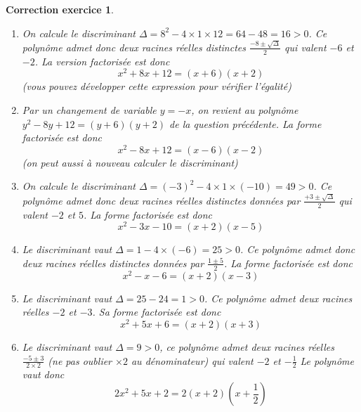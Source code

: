\documentclass[12pt]{article}
\newtheorem{correction}{\bf Correction exercice}
\newenvironment{cor}{
\begin{correction}\smallskip\normalfont}{\end{correction}
}
\newif\ifcorrige\corrigefalse
\begin{document}
\ifcorrige
\color{magenta}
\begin{cor}
  $\qquad$
\begin{enumerate}
\item On calcule le discriminant
  $\Delta = 8^2 - 4\times 1 \times 12 = 64 - 48 = 16 > 0$.
  Ce polyn\^ome admet donc deux racines r\'eelles distinctes
  $\frac{-8 \pm \sqrt{\Delta}}{2}$ qui valent $-6$ et $-2$.
  La version factoris\'ee est donc
  \begin{equation*}
    x^2 + 8x + 12
    =
    (x+6)(x+2)
  \end{equation*}
  (vous pouvez d\'evelopper cette expression pour v\'erifier l'\'egalit\'e)
\item Par un changement de variable $y=-x$, on revient au polyn\^ome
  $y^2-8y+12 = (y+6)(y+2)$ de la question pr\'ec\'edente.
  La forme factoris\'ee est donc
  \begin{equation*}
    x^2 - 8x + 12
    =
    (x-6)(x-2)
  \end{equation*}
  (on peut aussi \`a nouveau calculer le discriminant)
\item On calcule le discriminant
  $\Delta = (-3)^2 -4 \times 1 \times (-10) = 49 > 0$.
  Ce polyn\^ome admet donc deux racines r\'eelles distinctes donn\'ees par
  $\frac{+3\pm \sqrt{\Delta}}{2}$ qui valent $-2$ et $5$.
  La forme factoris\'ee est donc
  \begin{equation*}
    x^2-3x-10 = (x+2)(x-5)
  \end{equation*}
\item Le discriminant vaut $\Delta = 1 - 4 \times (-6) = 25 > 0$.
  Ce polyn\^ome admet donc deux racines r\'eelles distinctes
  donn\'ees par $\frac{1 \pm 5}{2}$.
  La forme factoris\'ee est donc
  \begin{equation*}
    x^2-x-6 = (x+2)(x-3)
  \end{equation*}
\item Le discriminant vaut $\Delta = 25 - 24 = 1>0$.
  Ce polyn\^ome admet deux racines r\'eelles $-2$ et $-3$.
  Sa forme factoris\'ee est donc
  \begin{equation*}
    x^2+5x+6 = (x+2)(x+3)
  \end{equation*}
\item
  Le discriminant vaut $\Delta = 9 > 0$, ce polyn\^ome admet deux racines r\'eelles
  $\frac{-5 \pm 3}{2\times 2}$ (ne pas oublier $\times 2$ au d\'enominateur)
  qui valent $-2$ et $-\frac12$
  Le polyn\^ome vaut donc
  \begin{equation*}
    2x^2+5x+2 = 2(x+2)(x+\frac12)

\end{equation*}
\end{enumerate}
\end{cor}
\end{document}
